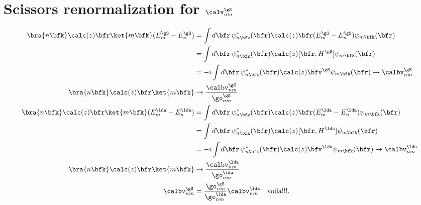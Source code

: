 \section{Scissors renormalization for $\calv^\gS_{nm}$}\label{voila}

\begin{align}\label{cdg.1}
\bra{n\bfk}\calc(z)\bfr\ket{m\bfk}(E^\gS_m-E^\gS_n) 
&=
\int d\bfr\,\psi^*_{n\bfk}(\bfr) 
\calc(z)\bfr (E^\gS_m-E^\gS_n) 
\psi_{m\bfk}(\bfr) 
\nonumber\\
&=
\int d\bfr\,\psi^*_{n\bfk}(\bfr) 
\calc(z)[\bfr,H^\gS]
\psi_{m\bfk}(\bfr) 
\nonumber\\
&=
-i\int d\bfr\,\psi^*_{n\bfk}(\bfr) 
\calc(z)\bfv^\gS 
\psi_{m\bfk}(\bfr) 
\to 
\calbv^\gS_{nm}
\nonumber\\
\bra{n\bfk}\calc(z)\bfr\ket{m\bfk}
&\to 
\frac{\calbv^\gS_{nm}}{\go^\gS_{nm}}
\nonumber\\
\bra{n\bfk}\calc(z)\bfr\ket{m\bfk}(E^\lda_m-E^\lda_n) 
&=
\int d\bfr\,\psi^*_{n\bfk}(\bfr) 
\calc(z)\bfr (E^\lda_m-E^\lda_n) 
\psi_{m\bfk}(\bfr) 
\nonumber\\
&=
\int d\bfr\,\psi^*_{n\bfk}(\bfr) 
\calc(z)[\bfr,H^\lda]
\psi_{m\bfk}(\bfr) 
\nonumber\\
&=
-i\int d\bfr\,\psi^*_{n\bfk}(\bfr) 
\calc(z)\bfv^\lda 
\psi_{m\bfk}(\bfr) 
\to 
\calbv^\lda_{nm}
\nonumber\\
\bra{n\bfk}\calc(z)\bfr\ket{m\bfk}
&\to 
\frac{\calbv^\lda_{nm}}{\go^\lda_{nm}}
\nonumber\\
\calbv^\gS_{nm}
&=
\frac{\go^\gS_{nm}}{\go^\lda_{nm}}
\calbv^\lda_{nm}\quad{\mathrm{voila}!!!}
.
\end{align}
